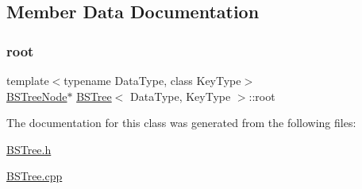 \subsection{Member Data Documentation}
\hypertarget{class_b_s_tree_a83534afce9094181ac031f9f596a8625}{}\label{class_b_s_tree_a83534afce9094181ac031f9f596a8625} 
\subsubsection{\texorpdfstring{root}{root}}
{\footnotesize\ttfamily template$<$typename Data\+Type, class Key\+Type$>$ \\
\hyperlink{class_b_s_tree_1_1_b_s_tree_node}{B\+S\+Tree\+Node}$\ast$ \hyperlink{class_b_s_tree}{B\+S\+Tree}$<$ Data\+Type, Key\+Type $>$\+::root\hspace{0.3cm}{\ttfamily [protected]}}



The documentation for this class was generated from the following files\+:\begin{DoxyCompactItemize}
\item 
\hyperlink{_b_s_tree_8h}{B\+S\+Tree.\+h}\item 
\hyperlink{_b_s_tree_8cpp}{B\+S\+Tree.\+cpp}\end{DoxyCompactItemize}
